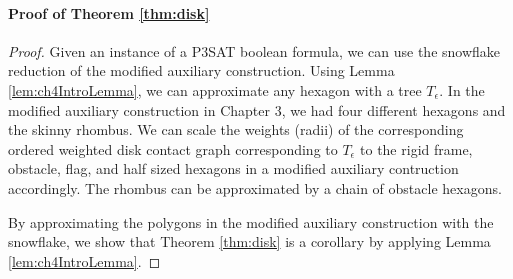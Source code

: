 \documentclass[10pt]{CSUNthesis}
\theoremstyle{plain}%
\theoremstyle{definition}
\theoremstyle{remark}
\begin{document}
\paragraph{Proof of Theorem \ref{thm:disk}}

\begin{proof}
Given an instance of a P3SAT boolean formula, we can use the snowflake reduction of the modified auxiliary construction.  
Using Lemma \ref{lem:ch4IntroLemma}, we can approximate any hexagon with a tree $T_\epsilon$.  In the modified auxiliary construction in Chapter 3, we had four different hexagons and the skinny rhombus.  
We can scale the weights (radii) of the corresponding ordered weighted disk contact graph corresponding to $T_\epsilon$ to the rigid frame, obstacle, flag, and half sized hexagons in a modified auxiliary contruction accordingly.  
The rhombus can be approximated by a chain of obstacle hexagons.

By approximating the polygons in the modified auxiliary construction with the snowflake, we show that Theorem \ref{thm:disk} is a corollary by applying Lemma \ref{lem:ch4IntroLemma}.  
\end{proof}



\end{document}

